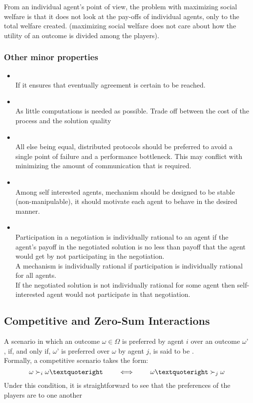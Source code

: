 		From an individual agent’s point of view, the problem with maximizing social welfare is that it does not look at the pay-offs of individual agents, only to the total welfare created. (maximizing social welfare does not care about how the utility of an outcome is divided among the players).


\subsubsection{Other minor properties}
\begin{itemize}
\item {}\\
If it ensures that eventually agreement is certain to be reached.
\item {}\\
As little computations is needed as possible. Trade off between the cost of the process and the solution quality
\item {}\\
All else being equal, distributed protocols should be preferred to avoid a single point of failure and a performance bottleneck. This may conflict with minimizing the amount of communication that is required.
\item {}\\
Among self interested agents, mechanism should be designed to be stable (non-manipulable), it should motivate each agent to behave in the desired manner.
\item {}\\
Participation in a negotiation is individually rational to an agent if the agent's payoff in the negotiated solution is no less than payoff that the agent would get by not participating in the negotiation.\\
A mechanism is individually rational if participation is individually rational for all agents.\\
If the negotiated solution is not individually rational for some agent then self-interested agent would not participate in that negotiation.
\end{itemize}
\subsection{Competitive and Zero-Sum Interactions}
A scenario in which an outcome $\omega\in\Omega$ is preferred by agent $i$ over an outcome $\omega’$, if, and only if, $\omega’$ is preferred over $\omega$ by agent $j$, is said to be .\\
	Formally, a competitive scenario takes the form:
	\[\omega \cmore_i \omega’\qquad\iff\qquad\omega’\cmore_j \omega\]
	Under this condition, it is straightforward to see that the preferences of the players are  to one another
	
